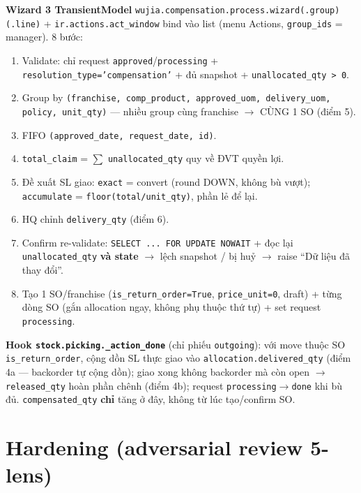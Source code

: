 \textbf{Wizard 3 TransientModel} \texttt{wujia.compensation.process.wizard(.group)(.line)} +
\texttt{ir.actions.act\_window} bind vào list (menu Actions, \texttt{group\_ids} = manager). 8 bước:
\begin{enumerate}
  \item Validate: chỉ request \texttt{approved}/\texttt{processing} + \texttt{resolution\_type='compensation'}
    + đủ snapshot + \texttt{unallocated\_qty > 0}.
  \item Group by \texttt{(franchise, comp\_product, approved\_uom, delivery\_uom, policy, unit\_qty)} ---
    nhiều group cùng franchise $\to$ CÙNG 1 SO (điểm 5).
  \item FIFO \texttt{(approved\_date, request\_date, id)}.
  \item \texttt{total\_claim} = $\sum$ \texttt{unallocated\_qty} quy về ĐVT quyền lợi.
  \item Đề xuất SL giao: \texttt{exact} = convert (round DOWN, không bù vượt); \texttt{accumulate} =
    \texttt{floor(total/unit\_qty)}, phần lẻ để lại.
  \item HQ chỉnh \texttt{delivery\_qty} (điểm 6).
  \item Confirm re-validate: \texttt{SELECT ... FOR UPDATE NOWAIT} + đọc lại \texttt{unallocated\_qty}
    \textbf{và state} $\to$ lệch snapshot / bị huỷ $\to$ raise ``Dữ liệu đã thay đổi''.
  \item Tạo 1 SO/franchise (\texttt{is\_return\_order=True}, \texttt{price\_unit=0}, draft) + từng dòng SO
    (gắn allocation ngay, không phụ thuộc thứ tự) + set request \texttt{processing}.
\end{enumerate}

\textbf{Hook \texttt{stock.picking.\_action\_done}} (chỉ phiếu \texttt{outgoing}): với move thuộc SO
\texttt{is\_return\_order}, cộng dồn SL thực giao vào \texttt{allocation.delivered\_qty} (điểm 4a ---
backorder tự cộng dồn); giao xong không backorder mà còn open $\to$ \texttt{released\_qty} hoàn phần chênh
(điểm 4b); request \texttt{processing}$\to$\texttt{done} khi bù đủ. \texttt{compensated\_qty} \textbf{chỉ}
tăng ở đây, không từ lúc tạo/confirm SO.

\section{Hardening (adversarial review 5-lens)}

